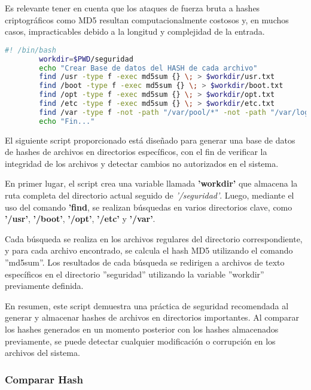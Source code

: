 			Es relevante tener en cuenta que los ataques de fuerza bruta a hashes criptográficos como MD5 resultan computacionalmente costosos y, en muchos casos, impracticables debido a la longitud y complejidad de la entrada.\par
			
							\vspace{0.3cm}
			\begin{lstlisting}[language=Bash, caption=Generar Hash]
		#! /bin/bash
		workdir=$PWD/seguridad
		echo "Crear Base de datos del HASH de cada archivo"
		find /usr -type f -exec md5sum {} \; > $workdir/usr.txt
		find /boot -type f -exec md5sum {} \; > $workdir/boot.txt
		find /opt -type f -exec md5sum {} \; > $workdir/opt.txt
		find /etc -type f -exec md5sum {} \; > $workdir/etc.txt
		find /var -type f -not -path "/var/pool/*" -not -path "/var/log/*" -not -path "/var/tmp/*" -exec md5sum {} \; > $workdir/var.txt
		echo "Fin..."
			\end{lstlisting}
			
			El siguiente script proporcionado está diseñado para generar una base de datos de hashes de archivos en directorios específicos, con el fin de verificar la integridad de los archivos y detectar cambios no autorizados en el sistema.\par
			
			En primer lugar, el script crea una variable llamada \textbf{'workdir'} que almacena la ruta completa del directorio actual seguido de \textit{'/seguridad'}. Luego, mediante el uso del comando \textbf{'find}, se realizan búsquedas en varios directorios clave, como \textbf{'/usr'}, \textbf{'/boot'}, \textbf{'/opt'}, \textbf{'/etc'} y \textbf{'/var'}.
			
			Cada búsqueda se realiza en los archivos regulares del directorio correspondiente, y para cada archivo encontrado, se calcula el hash MD5 utilizando el comando ''md5sum''. Los resultados de cada búsqueda se redirigen a archivos de texto específicos en el directorio ''seguridad'' utilizando la variable ''workdir'' previamente definida.
			
			En resumen, este script demuestra una práctica de seguridad recomendada al generar y almacenar hashes de archivos en directorios importantes. Al comparar los hashes generados en un momento posterior con los hashes almacenados previamente, se puede detectar cualquier modificación o corrupción en los archivos del sistema.
			
			
			\subsubsection{Comparar Hash}
			
